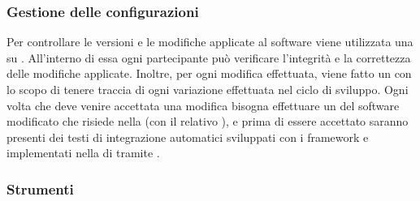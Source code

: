 \subsubsection{Gestione delle configurazioni}
Per controllare le versioni e le modifiche applicate al software viene utilizzata una  su . All'interno di essa ogni partecipante può verificare l'integrità e la correttezza delle modifiche applicate. Inoltre, per ogni modifica effettuata, viene fatto un  con lo scopo di tenere traccia di ogni variazione effettuata nel ciclo di sviluppo. Ogni volta che deve venire accettata una modifica bisogna effettuare un 	 del software modificato che risiede nella  (con il relativo ), e prima di essere accettato saranno presenti dei testi di integrazione automatici sviluppati con i framework  e  implementati nella  di  tramite .

\subsubsection{Strumenti}

